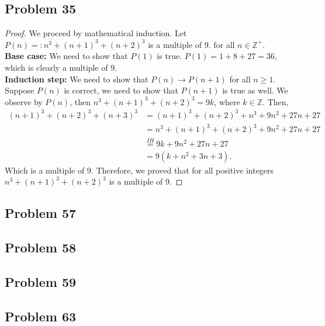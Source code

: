 \documentclass[a4paper,12pt]{article}
\begin{document}
\subsection*{Problem 35}
\begin{proof}
    We proceed by mathematical induction. Let $P(n)=: n^3+(n+1)^3+(n+2)^3$ is a multiple of 9. for all $n \in \mathbb{Z^+}.$\\
\textbf{Base case:} We need to show that $P(1)$ is true. $P(1)=1+8+27=36$, which is clearly a multiple of $9.$\\
\textbf{Induction step:} We need to show that $P(n) \to P(n+1)$ for all $n \geq 1.$ Suppose $P(n)$ is correct, we need to show that $P(n+1)$ is true as well. We observe by $P(n)$, then $n^3+(n+1)^3+(n+2)^3=9k$, where $k \in \mathbb{Z}.$
Then, 
\begin{align*}
    (n+1)^3+(n+2)^3+(n+3)^3&=(n+1)^3+(n+2)^3+n^3+9n^2+27n+27\\
    &=n^3+(n+1)^3+(n+2)^3+9n^2+27n+27\\
&\overset{IH}{=}9k+9n^2+27n+27\\
    &=9(k+n^2+3n+3).
\end{align*}
Which is a multiple of $9$. Therefore, we proved that for all positive integers $n^3+(n+1)^3+(n+2)^3$ is a multiple of 9.
\end{proof}
\subsection*{Problem 57}
\subsection*{Problem 58}
\subsection*{Problem 59}
\subsection*{Problem 63}
\end{document}
